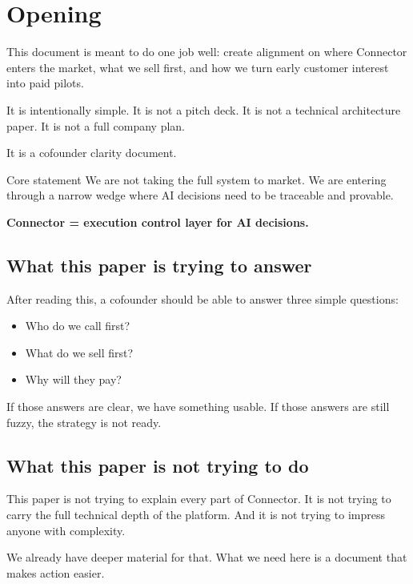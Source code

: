 \chapter{Opening}

This document is meant to do one job well:
create alignment on where Connector enters the market, what we sell first, and how we turn early customer interest into paid pilots.

It is intentionally simple.
It is not a pitch deck.
It is not a technical architecture paper.
It is not a full company plan.

It is a cofounder clarity document.

\begin{conceptbox}{Core statement}
We are not taking the full system to market.
We are entering through a narrow wedge where AI decisions need to be traceable and provable.

\smallskip
\centering
\Large\bfseries Connector = execution control layer for AI decisions.
\end{conceptbox}

\section{What this paper is trying to answer}

After reading this, a cofounder should be able to answer three simple questions:

\begin{itemize}
  \item Who do we call first?
  \item What do we sell first?
  \item Why will they pay?
\end{itemize}

If those answers are clear, we have something usable.
If those answers are still fuzzy, the strategy is not ready.

\section{What this paper is not trying to do}

This paper is not trying to explain every part of Connector.
It is not trying to carry the full technical depth of the platform.
And it is not trying to impress anyone with complexity.

We already have deeper material for that.
What we need here is a document that makes action easier.

